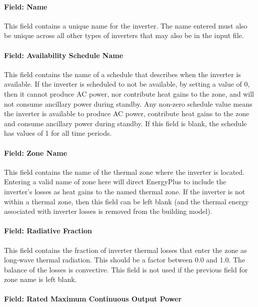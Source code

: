 \paragraph{Field: Name}\label{field-name-4-008}

This field contains a unique name for the inverter. The name entered must also be unique across all other types of inverters that may also be in the input file.

\paragraph{Field: Availability Schedule Name}\label{field-availability-schedule-name-3-001}

This field contains the name of a schedule that describes when the inverter is available. If the inverter is scheduled to not be available, by setting a value of 0, then it cannot produce AC power, nor contribute heat gains to the zone, and will not consume ancillary power during standby. Any non-zero schedule value means the inverter is available to produce AC power, contribute heat gains to the zone and consume ancillary power during standby. If this field is blank, the schedule has values of 1 for all time periods.

\paragraph{Field: Zone Name}\label{field-zone-name-3-000}

This field contains the name of the thermal zone where the inverter is located. Entering a valid name of zone here will direct EnergyPlus to include the inverter's losses as heat gains to the named thermal zone. If the inverter is not within a thermal zone, then this field can be left blank (and the thermal energy associated with inverter losses is removed from the building model).

\paragraph{Field: Radiative Fraction}\label{field-radiative-fraction-3}

This field contains the fraction of inverter thermal losses that enter the zone as long-wave thermal radiation. This should be a factor between 0.0 and 1.0. The balance of the losses is convective. This field is not used if the previous field for zone name is left blank.

\paragraph{Field: Rated Maximum Continuous Output Power}\label{field-rated-maximum-continuous-output-power}

